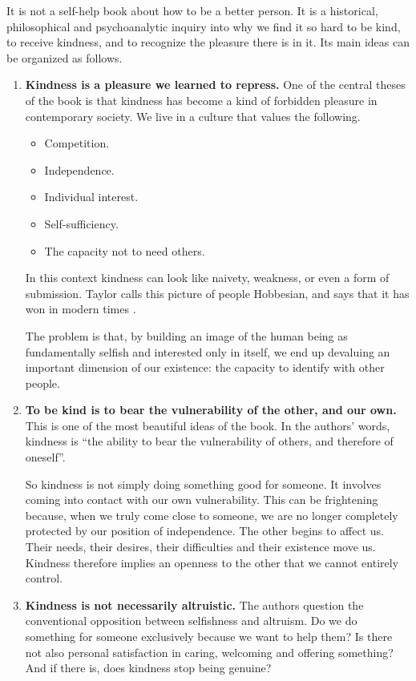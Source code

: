 It is not a self-help book about how to
be a better person. It is a historical,
philosophical and psychoanalytic inquiry
into why we find it so hard to be kind,
to receive kindness, and to recognize
the pleasure there is in it. Its main
ideas can be organized as follows.

\begin{enumerate}
\item {\bf Kindness is a pleasure we
learned to repress.} One of the central
theses of the book is that kindness has
become a kind of forbidden pleasure in
contemporary society. We live in a
culture that values the following.

\begin{itemize}
\item Competition.
\item Independence.
\item Individual interest.
\item Self-sufficiency.
\item The capacity not to need others.
\end{itemize}

In this context kindness can look like
naivety, weakness, or even a form of
submission. Taylor calls this picture of
people Hobbesian, and says that it has
won in modern times
\cite{smallwood-back-talk}.

The problem is that, by building an
image of the human being as
fundamentally selfish and interested
only in itself, we end up devaluing an
important dimension of our existence:
the capacity to identify with other
people.

\item {\bf To be kind is to bear the
vulnerability of the other, and our
own.} This is one of the most beautiful
ideas of the book. In the authors'
words, kindness is ``the ability to bear
the vulnerability of others, and
therefore of oneself''.

So kindness is not simply doing
something good for someone. It involves
coming into contact with our own
vulnerability. This can be frightening
because, when we truly come close to
someone, we are no longer completely
protected by our position of
independence. The other begins to affect
us. Their needs, their desires, their
difficulties and their existence move
us. Kindness therefore implies an
openness to the other that we cannot
entirely control.

\item {\bf Kindness is not necessarily
altruistic.} The authors question the
conventional opposition between
selfishness and altruism. Do we do
something for someone exclusively
because we want to help them? Is there
not also personal satisfaction in
caring, welcoming and offering
something? And if there is, does
kindness stop being genuine?


\end{enumerate}
